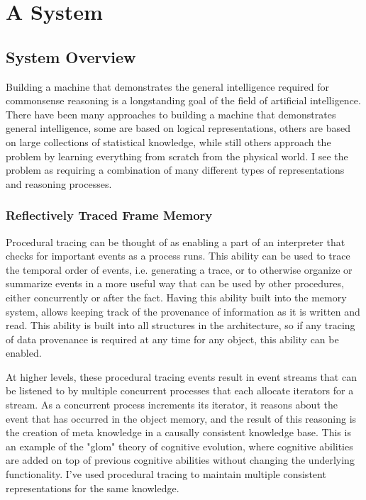 \chapter{A System}\label{ch:a_system}

\section{System Overview}

Building a machine that demonstrates the general intelligence required
for commonsense reasoning is a longstanding goal of the field of
artificial intelligence.  There have been many approaches to building
a machine that demonstrates general intelligence, some are based on
logical representations, others are based on large collections of
statistical knowledge, while still others approach the problem by
learning everything from scratch from the physical world.  I see the
problem as requiring a combination of many different types of
representations and reasoning processes.




\subsection{Reflectively Traced Frame Memory}

Procedural tracing can be thought of as enabling a part of an
interpreter that checks for important events as a process runs.  This
ability can be used to trace the temporal order of events, i.e.
generating a trace, or to otherwise organize or summarize events in a
more useful way that can be used by other procedures, either
concurrently or after the fact.  Having this ability built into the
memory system, allows keeping track of the provenance of information as
it is written and read.  This ability is built into all structures in
the architecture, so if any tracing of data provenance is required at
any time for any object, this ability can be enabled.

At higher levels, these procedural tracing events result in event
streams that can be listened to by multiple concurrent processes that
each allocate iterators for a stream.  As a concurrent process
increments its iterator, it reasons about the event that has occurred
in the object memory, and the result of this reasoning is the creation
of meta knowledge in a causally consistent knowledge base.  This is an
example of the "glom" theory of cognitive evolution, where cognitive
abilities are added on top of previous cognitive abilities without
changing the underlying functionality.  I've used procedural tracing
to maintain multiple consistent representations for the same
knowledge.

